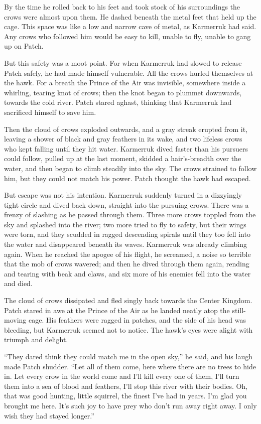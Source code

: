 \documentclass[ebook,oneside,openany,17pt]{memoir}
\begin{document}
By the time he rolled back to his feet and took stock of his
surroundings the crows were almost upon them. He dashed beneath the
metal feet that held up the cage. This space was like a low and narrow
cave of metal, as Karmerruk had said. Any crows who followed him would
be easy to kill, unable to fly, unable to gang up on Patch.

But this safety was a moot point. For when Karmerruk had slowed to
release Patch safely, he had made himself vulnerable. All the crows
hurled themselves at the hawk. For a breath the Prince of the Air was
invisible, somewhere inside a whirling, tearing knot of crows; then
the knot began to plummet downwards, towards the cold river. Patch
stared aghast, thinking that Karmerruk had sacrificed himself to save
him.

Then the cloud of crows exploded outwards, and a gray streak erupted
from it, leaving a shower of black and gray feathers in its wake, and
two lifeless crows who kept falling until they hit water. Karmerruk
dived faster than his pursuers could follow, pulled up at the last
moment, skidded a hair’s-breadth over the water, and then began to
climb steadily into the sky. The crows strained to follow him, but
they could not match his power. Patch thought the hawk had escaped.

But escape was not his intention. Karmerruk suddenly turned in a
dizzyingly tight circle and dived back down, straight into the
pursuing crows. There was a frenzy of slashing as he passed through
them. Three more crows toppled from the sky and splashed into the
river; two more tried to fly to safety, but their wings were torn, and
they scudded in ragged descending spirals until they too fell into the
water and disappeared beneath its waves. Karmerruk was already
climbing again. When he reached the apogee of his flight, he screamed,
a noise so terrible that the mob of crows wavered; and then he dived
through them again, rending and tearing with beak and claws, and six
more of his enemies fell into the water and died.

The cloud of crows dissipated and fled singly back towards the Center
Kingdom. Patch stared in awe at the Prince of the Air as he landed
neatly atop the still-moving cage. His feathers were ragged in
patches, and the side of his head was bleeding, but Karmerruk seemed
not to notice. The hawk’s eyes were alight with triumph and delight.

“They dared think they could match me in the open sky,” he said, and
his laugh made Patch shudder. “Let all of them come, here where there
are no trees to hide in. Let every crow in the world come and I’ll
kill every one of them, I’ll turn them into a sea of blood and
feathers, I’ll stop this river with their bodies. Oh, that was good
hunting, little squirrel, the finest I’ve had in years. I’m glad you
brought me here. It’s such joy to have prey who don’t run away right
away. I only wish they had stayed longer.”
\end{document}
